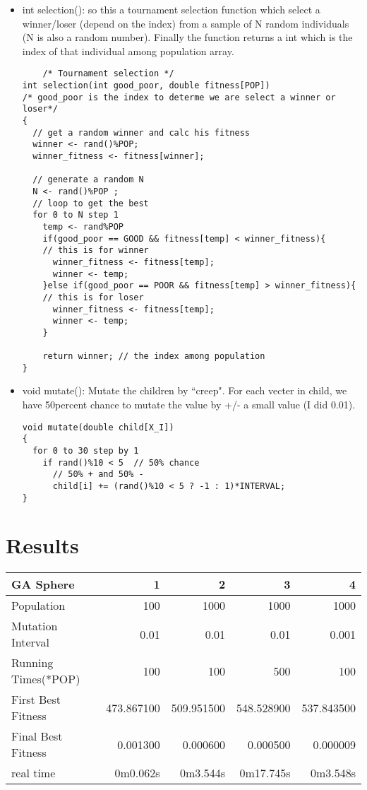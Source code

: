 \documentclass[12pt]{article}
\begin{document}
\begin{itemize}
	\item int selection(): so this a tournament selection function which select a winner/loser (depend on the index) from a sample of N random individuals (N is also a random number). Finally the function returns a int which is the index of that individual among population array.
	\begin{lstlisting}
	/* Tournament selection */
int selection(int good_poor, double fitness[POP]) 
/* good_poor is the index to determe we are select a winner or loser*/
{
  // get a random winner and calc his fitness
  winner <- rand()%POP;
  winner_fitness <- fitness[winner];
  
  // generate a random N
  N <- rand()%POP ;
  // loop to get the best
  for 0 to N step 1
    temp <- rand%POP
    if(good_poor == GOOD && fitness[temp] < winner_fitness){		
    // this is for winner
      winner_fitness <- fitness[temp];
      winner <- temp;
    }else if(good_poor == POOR && fitness[temp] > winner_fitness){	
    // this is for loser
      winner_fitness <- fitness[temp];
      winner <- temp;
    }
    
    return winner; // the index among population
}
	\end{lstlisting}
	
	\item void mutate(): Mutate the children by ``creep". For each vecter in child, we have 50percent chance to mutate the value by +/- a small value (I did 0.01).
	\begin{lstlisting}
void mutate(double child[X_I])
{
  for 0 to 30 step by 1
    if rand()%10 < 5  // 50% chance
      // 50% + and 50% -
      child[i] += (rand()%10 < 5 ? -1 : 1)*INTERVAL;
}
	\end{lstlisting}
	
\end{itemize}

\section{Results}
	\begin{center}
	\begin{tabular}{| l | r | r | r | r | }
	\hline
	\bf GA Sphere & \bf 1 & \bf 2 & \bf 3 & \bf 4 \\
	\hline
	Population & 100 & 1000 & 1000 & 1000 \\
	Mutation Interval & 0.01 & 0.01 & 0.01 & 0.001 \\
	Running Times(*POP) & 100 & 100 & 500 & 100 \\
	First Best Fitness & 473.867100 & 509.951500 & 548.528900 & 537.843500 \\
	Final Best Fitness & 0.001300 & 0.000600 & 0.000500 & 0.000009 \\
	real time & 0m0.062s & 0m3.544s & 0m17.745s & 0m3.548s \\
	\hline
	\end{tabular}
	\end{center}
 
\end{document}
